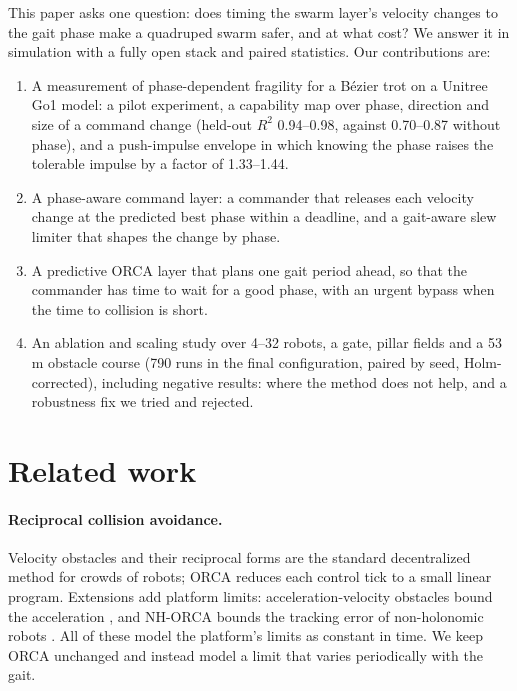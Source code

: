 This paper asks one question: does timing the swarm layer's velocity changes to the gait phase make a
quadruped swarm safer, and at what cost? We answer it in simulation with a fully open stack and paired
statistics. Our contributions are:
\begin{enumerate}
  \item A measurement of phase-dependent fragility for a B\'ezier trot on a Unitree Go1 model: a pilot
    experiment, a capability map over phase, direction and size of a command change (held-out
    $R^2$ 0.94--0.98, against 0.70--0.87 without phase), and a push-impulse envelope in which knowing the
    phase raises the tolerable impulse by a factor of 1.33--1.44.
  \item A phase-aware command layer: a commander that releases each velocity change at the predicted best
    phase within a deadline, and a gait-aware slew limiter that shapes the change by phase.
  \item A predictive ORCA layer that plans one gait period ahead, so that the commander has time to wait
    for a good phase, with an urgent bypass when the time to collision is short.
  \item An ablation and scaling study over 4--32 robots, a gate, pillar fields and a 53\,m obstacle course
    (790 runs in the final configuration, paired by seed, Holm-corrected), including negative results:
    where the method does not help, and a robustness fix we tried and rejected.
\end{enumerate}

\section{Related work}\label{sec:related}

\paragraph{Reciprocal collision avoidance.} Velocity obstacles and their reciprocal forms
\cite{vandenberg2008rvo,vandenberg2011orca} are the standard decentralized method for crowds of robots;
ORCA reduces each control tick to a small linear program. Extensions add platform limits:
acceleration-velocity obstacles bound the acceleration \cite{vandenberg2011avo}, and NH-ORCA bounds the
tracking error of non-holonomic robots \cite{alonsomora2013nhorca}. All of these model the platform's
limits as constant in time. We keep ORCA unchanged and instead model a limit that varies periodically with
the gait.

